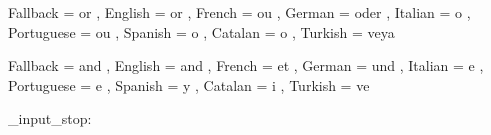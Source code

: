   {
    Fallback   = or ,
    English    = or ,
    French     = ou ,
    German     = oder ,
    Italian    = o ,
    Portuguese = ou ,
    Spanish    = o ,
    Catalan    = o ,
    Turkish    = veya
  }

  {
    Fallback   = and ,
    English    = and ,
    French     = et ,
    German     = und ,
    Italian    = e ,
    Portuguese = e ,
    Spanish    = y ,
    Catalan    = i ,
    Turkish    = ve
  }
  
\file_input_stop:
